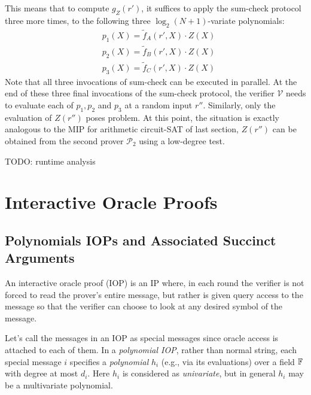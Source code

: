 \documentclass{article}
\begin{document}
This means that to compute $g_Z(r')$, it suffices to apply the sum-check protocol three more times, to the following three $\log_2 (N+1)$-variate polynomials:
\begin{equation*}
\begin{split}
& p_1(X) =  \widetilde{f}_A(r', X) \cdot Z(X) \\
& p_2(X) =  \widetilde{f}_{B}(r', X) \cdot Z(X) \\
& p_3(X) =  \widetilde{f}_{C}(r', X) \cdot Z(X)
\end{split}
\end{equation*}
Note that all three invocations of sum-check can be executed in parallel. At the end of these three final invocations of the sum-check protocol, the verifier $\mathcal{V}$ needs to evaluate each of $p_1, p_2$ and $p_3$ at a random input $r''$. Similarly, only the evaluation of $Z(r'')$ poses problem. At this point, the situation is exactly analogous to the MIP for arithmetic circuit-SAT of last section, $Z(r'')$ can be obtained from the second prover $\mathcal{P}_2$ using a low-degree test. 

\colorbox{BurntOrange}{TODO: runtime analysis}

\section{Interactive Oracle Proofs}

\subsection{Polynomials IOPs and Associated Succinct Arguments}

\begin{boxx1}
An interactive oracle proof (IOP) is an IP where, in each round the verifier is not forced to read the prover's entire message, but rather is given query access to the message so that the verifier can choose to look at any desired symbol of the message.
\end{boxx1}

Let's call the messages in an IOP as special messages since oracle access is attached to each of them. In a \textit{polynomial IOP}, rather than normal string, each special message $i$ specifies a \textit{polynomial} $h_i$ (e.g., via its evaluations) over a field $\mathbb{F}$ with degree at most $d_i$. Here $h_i$ is considered as \textit{univariate}, but in general $h_i$ may be a multivariate polynomial. 
\end{document}
